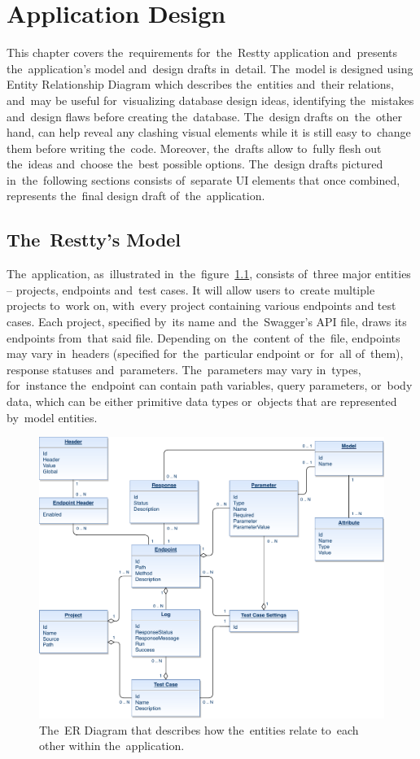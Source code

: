 \chapter{Application Design}
\label{Design}
This chapter covers the~requirements for~the~Restty application and~presents
the~application's model and~design drafts in~detail. The~model is designed using Entity Relationship Diagram
which describes the~entities and~their relations, and~may be useful for~visualizing database design ideas,
identifying the~mistakes and~design flaws before creating the~database.
The~design drafts on~the~other hand, can help reveal any clashing visual elements while it is still easy
to~change them before writing the~code. Moreover, the~drafts allow to~fully flesh out the~ideas
and~choose the~best possible options. The~design drafts pictured in~the~following sections consists of~separate
UI elements that once combined, represents the~final design draft of~the~application.

\section{The~Restty's Model}
The~application, as~illustrated in~the~figure~\ref{fig-erd}, consists of~three major entities -- projects, endpoints and~test cases. It will allow users
to~create multiple projects to~work on, with~every project containing various endpoints and test cases. Each project,
specified by~its name and~the~Swagger's API file, draws its endpoints from~that said file. Depending on~the~content
of~the~file, endpoints may vary in~headers (specified for~the~particular endpoint or~for~all of~them), response
statuses and~parameters. The~parameters may vary in~types, for~instance the~endpoint can contain path variables, query parameters,
or~body data, which can be either primitive data types or~objects that are represented by~model entities.

\begin{figure}[!hbt]
	\centering
	\includegraphics[scale=0.7]{./figures/erd.pdf}
	\caption{The~ER Diagram that describes how the~entities relate to~each other within the~application.}
	\label{fig-erd}
\end{figure}

